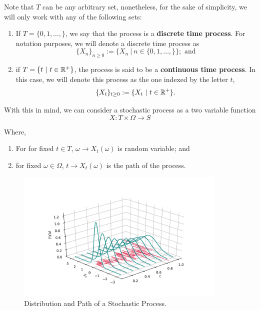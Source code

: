 \documentclass[../TGMAFFIRO.tex]{subfiles}
\begin{document}
Note that $T$ can be any arbitrary set, nonetheless, for the sake of simplicity, we will only work with any of the following sets:
\begin{enumerate}
	\item If $T = \{0, 1, \ldots, \}$, we say that the process is a \textbf{discrete time process}. For notation purposes, we will denote a discrete time process as
	\begin{equation}
		\{X_n\}_{n\geq 0}:= \{X_n \ | \ n \in \{0, 1, \ldots, \}\}; \text{ and}
	\end{equation}
	
	\item if $T = \{t \ | \ t\in\RNums^+\}$, the process is said to be a \textbf{continuous time process}. In this case, we will denote this process as the one indexed by the letter $t$,
	\begin{equation}
		\{X_t\}_{t\geq 0} := \{X_t \ | \ t \in \mathbb{R}^+\}.
	\end{equation}
\end{enumerate}

With this in mind, we can consider a stochastic process as a two variable function
\[
	X: T\times\Omega \to S
\]

Where,
\begin{enumerate}
	\item For for fixed $t\in T$, $\omega \to X_t(\omega)$ is random variable; and
	\item for fixed $\omega \in \Omega$, $t \to X_t(\omega)$ is the path of the process.
\end{enumerate}


\begin{figure}[h]
	\centering
	\includegraphics[width=0.90\textwidth]{../images/stoch_process_3d}
	\caption{Distribution and Path of a Stochastic Process.}
	\label{fig:stochastic_process}
\end{figure}
\end{document}
